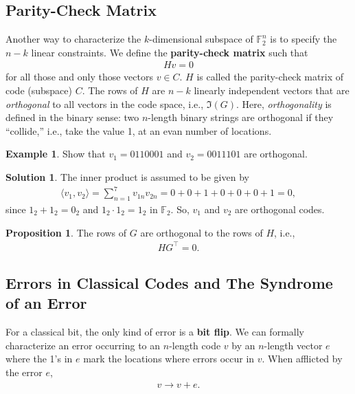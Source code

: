 \documentclass{article}
\theoremstyle{definition}
\newtheorem{exmp}{Example}[section]
\newtheorem{sln}{Solution}[section]
\newtheorem{prop}{Proposition}[section]
\begin{document}
\subsection{Parity-Check Matrix}
Another way to characterize the $k$-dimensional subspace of $\mathbb{F}^n_2$ is to specify the $n-k$ linear constraints. We define the \textbf{parity-check matrix} such that
\begin{align}
Hv = 0
\end{align}
for all those and only those vectors $v \in C$. $H$ is called the parity-check matrix of code (subspace) $C$. The rows of $H$ are $n-k$ linearly independent vectors that are \textit{orthogonal} to all vectors in the code space, i.e., $\Im(G)$. Here, \textit{orthogonality} is defined in the binary sense: two $n$-length binary strings are orthogonal if they ``collide,'' i.e., take the value 1, at an evan number of locations.

\begin{exmp}
	Show that $v_1 = 0110001$ and $v_2 = 0011101$ are orthogonal. \\
	
	\begin{sln}
		The inner product is assumed to be given by
		\begin{align}
		\langle v_1 , v_2 \rangle = \sum^7_{n=1}v_{1n}v_{2n} = 0 + 0 + 1 + 0 + 0 + 0 + 1 = 0,
		\end{align}
		since $1_2+1_2 = 0_2$ and $1_2\cdot 1_2 = 1_2$ in $\mathbb{F}_2$. So, $v_1$ and $v_2$ are orthogonal codes. \\
	\end{sln}
\end{exmp}





\begin{prop}
	The rows of $G$ are orthogonal to the rows of $H$, i.e., 
	\begin{align}
	HG^\top = 0.
	\end{align}
\end{prop}


\subsection{Errors in Classical Codes and The Syndrome of an Error}

For a classical bit, the only kind of error is a \textbf{bit flip}. We can formally characterize an error occurring to an $n$-length code $v$ by an $n$-length vector $e$ where the 1's in $e$ mark the locations where errors occur in $v$. When afflicted by the error $e$,
\begin{align}
v \to v+ e.
\end{align}
\end{document}
